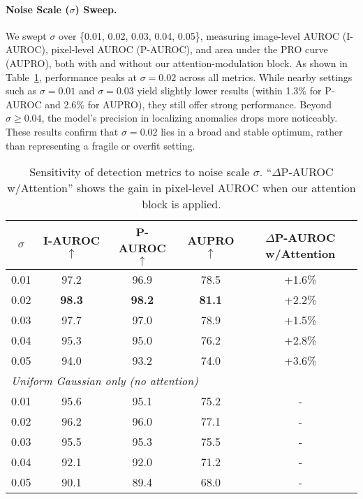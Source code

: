 \documentclass[a4paper,fleqnn]{cas-sc}
\begin{document}
\paragraph{Noise Scale ($\sigma$) Sweep.} 
We swept $\sigma$ over \{0.01, 0.02, 0.03, 0.04, 0.05\}, measuring image-level AUROC (I-AUROC), pixel-level AUROC (P-AUROC), and area under the PRO curve (AUPRO), both with and without our attention-modulation block. As shown in Table~\ref{tab:sigma_sweep}, performance peaks at $\sigma = 0.02$ across all metrics. While nearby settings such as $\sigma = 0.01$ and $\sigma = 0.03$ yield slightly lower results (within 1.3\% for P-AUROC and 2.6\% for AUPRO), they still offer strong performance. Beyond $\sigma \ge 0.04$, the model's precision in localizing anomalies drops more noticeably. These results confirm that $\sigma = 0.02$ lies in a broad and stable optimum, rather than representing a fragile or overfit setting.

\renewcommand{\thetable}{11}

\begin{table}[ht]
  \centering
  \caption{Sensitivity of detection metrics to noise scale $\sigma$. ``$\Delta$P-AUROC w/Attention'' shows the gain in pixel-level AUROC when our attention block is applied.}
  \label{tab:sigma_sweep}
  \begin{tabular}{c|ccc|c}
    \toprule
    $\sigma$ & I-AUROC $\uparrow$ & P-AUROC $\uparrow$ & AUPRO $\uparrow$ & $\Delta$P-AUROC w/Attention \\
    \midrule
    0.01 & 97.2 & 96.9 & 78.5 & +1.6\% \\
    0.02 & \textbf{98.3} & \textbf{98.2} & \textbf{81.1} & +2.2\% \\
    0.03 & 97.7 & 97.0 & 78.9 & +1.5\% \\
    0.04 & 95.3 & 95.0 & 76.2 & +2.8\% \\
    0.05 & 94.0 & 93.2 & 74.0 & +3.6\% \\
    \midrule
    \multicolumn{5}{l}{\emph{Uniform Gaussian only (no attention)}} \\
    0.01 & 95.6 & 95.1 & 75.2 & - \\
    0.02 & 96.2 & 96.0 & 77.1 & - \\
    0.03 & 95.5 & 95.3 & 75.5 & - \\
    0.04 & 92.1 & 92.0 & 71.2 & - \\
    0.05 & 90.1 & 89.4 & 68.0 & - \\
    \bottomrule
  \end{tabular}
\end{table}
\end{document}
